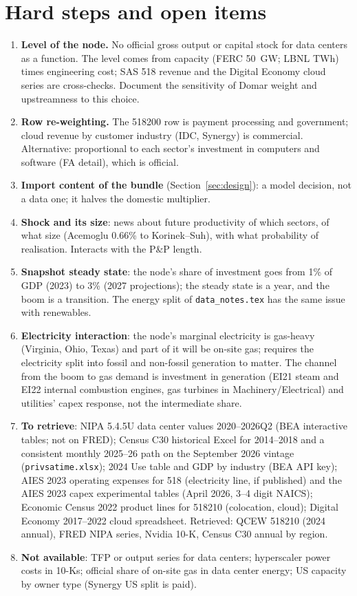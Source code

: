 \documentclass[11pt]{article}
\begin{document}
\section{Hard steps and open items}\label{sec:hard}
\begin{enumerate}
  \item \textbf{Level of the node.} No official gross output or capital stock for data centers as a function. The level comes from capacity (FERC 50~GW; LBNL TWh) times engineering cost; SAS 518 revenue and the Digital Economy cloud series are cross-checks. Document the sensitivity of Domar weight and upstreamness to this choice.
  \item \textbf{Row re-weighting.} The 518200 row is payment processing and government; cloud revenue by customer industry (IDC, Synergy) is commercial. Alternative: proportional to each sector's investment in computers and software (FA detail), which is official.
  \item \textbf{Import content of the bundle} (Section~\ref{sec:design}): a model decision, not a data one; it halves the domestic multiplier.
  \item \textbf{Shock and its size}: news about future productivity of which sectors, of what size (Acemoglu 0.66\% to Korinek--Suh), with what probability of realisation. Interacts with the P\&P length.
  \item \textbf{Snapshot steady state}: the node's share of investment goes from 1\% of GDP (2023) to 3\% (2027 projections); the steady state is a year, and the boom is a transition. The energy split of \texttt{data\_notes.tex} has the same issue with renewables.
  \item \textbf{Electricity interaction}: the node's marginal electricity is gas-heavy (Virginia, Ohio, Texas) and part of it will be on-site gas; requires the electricity split into fossil and non-fossil generation to matter. The channel from the boom to gas demand is investment in generation (EI21 steam and EI22 internal combustion engines, gas turbines in Machinery/Electrical) and utilities' capex response, not the intermediate share.
  \item \textbf{To retrieve}: NIPA 5.4.5U data center values 2020--2026Q2 (BEA interactive tables; not on FRED); Census C30 historical Excel for 2014--2018 and a consistent monthly 2025--26 path on the September 2026 vintage (\texttt{privsatime.xlsx}); 2024 Use table and GDP by industry (BEA API key); AIES 2023 operating expenses for 518 (electricity line, if published) and the AIES 2023 capex experimental tables (April 2026, 3--4 digit NAICS); Economic Census 2022 product lines for 518210 (colocation, cloud); Digital Economy 2017--2022 cloud spreadsheet. Retrieved: QCEW 518210 (2024 annual), FRED NIPA series, Nvidia 10-K, Census C30 annual by region.
  \item \textbf{Not available}: TFP or output series for data centers; hyperscaler power costs in 10-Ks; official share of on-site gas in data center energy; US capacity by owner type (Synergy US split is paid).
\end{enumerate}
\end{document}
